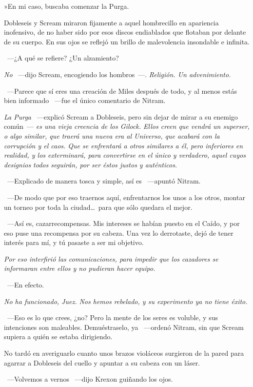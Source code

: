 »En mi caso, buscaba comenzar la Purga.

Dobleseis y Scream miraron fijamente a aquel hombrecillo en apariencia inofensivo, de no haber sido por esos discos endiablados que flotaban por delante de su cuerpo. En sus ojos se reflejó un brillo de malevolencia insondable e infinita.

~---¿A qué se refiere? ¿Un alzamiento?

\emph{No} ~---dijo Scream, encogiendo los hombros~---. \emph{Religión. Un advenimiento.}

~---Parece que sí eres una creación de Miles después de todo, y al menos estás bien informado ~---fue el único comentario de Nitram.

\emph{La Purga} ~---explicó Scream a Dobleseis, pero sin dejar de mirar a su enemigo común~--- \emph{es una vieja creencia de los Gilock. Ellos creen que vendrá un superser, o algo similar, que traerá una nueva era al Universo, que acabará con la corrupción y el caos. Que se enfrentará a otros similares a él, pero inferiores en realidad, y los exterminará, para convertirse en el único y verdadero, aquel cuyos designios todos seguirán, por ser éstos justos y auténticos.}

~---Explicado de manera tosca y simple, así es ~---apuntó Nitram.

~---De modo que por eso traernos aquí, enfrentarnos los unos a los otros, montar un torneo por toda la ciudad\dots\ para que sólo quedara el mejor.

~---Así es, cazarrecompensas. Mis intereses se habían puesto en el Caído, y por eso puse una recompensa por su cabeza. Una vez lo derrotaste, dejó de tener interés para mí, y tú pasaste a ser mi objetivo.

\emph{Por eso interfirió las comunicaciones, para impedir que los cazadores se informaran entre ellos y no pudieran hacer equipo.}

~---En efecto.

\emph{No ha funcionado, Juez. Nos hemos rebelado, y su experimento ya no tiene éxito.}

~---Eso es lo que crees, ¿no? Pero la mente de los seres es voluble, y sus intenciones son maleables. Demuéstraselo, ya ~---ordenó Nitram, sin que Scream supiera a quién se estaba dirigiendo.

No tardó en averiguarlo cuanto unos brazos violáceos surgieron de la pared para agarrar a Dobleseis del cuello y apuntar a su cabeza con un láser.

~---Volvemos a vernos ~---dijo Krexon guiñando los ojos.

